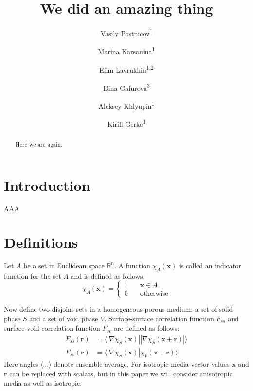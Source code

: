 \documentclass[reprint,amsmath,amssymb,aps,pre,showkeys,showpacs]{revtex4-1}
\begin{document}

\author{Vasily Postnicov\textsuperscript{1}}
\author{Marina Karsanina\textsuperscript{1}}
\author{Efim Lavrukhin\textsuperscript{1,2}}
\author{Dina Gafurova\textsuperscript{3}}
\author{Aleksey Khlyupin\textsuperscript{1}}
\author{Kirill Gerke\textsuperscript{1}}


\title{We did an amazing thing}

\begin{abstract}
  Here we are again.
\end{abstract}

\maketitle

\section{Introduction}
\label{sec:intro}
AAA

\section{Definitions}
\label{sec:def}
Let $A$ be a set in Euclidean space $\mathbb{R}^n$. A function
$\chi_A(\mathbf{x})$ is called an indicator function for the set $A$ and is
defined as follows:
\begin{equation*}
  \chi_A(\bm{x}) = \left\{
  \begin{array}{ll}
    1 & \quad \bm{x} \in A \\
    0 & \quad \text{otherwise}
  \end{array}
  \right.
\end{equation*}

Now define two disjoint sets in a homogeneous porous medium: a set of solid
phase $S$ and a set of void phase $V$. Surface-surface correlation function
$F_{ss}$ and surface-void correlation function $F_{sv}$ are defined as follows:
\begin{align}
  F_{ss}(\bm{r}) &= \langle |\nabla \chi_S(\bm{x})| |\nabla \chi_S(\bm{x} +
  \bm{r})| \rangle \label{eq:fss} \\
  F_{sv}(\bm{r}) &= \langle |\nabla \chi_S(\bm{x})| \chi_V(\bm{x} +
  \bm{r}) \rangle \label{eq:fsv}
\end{align}
Here angles $\langle \dots \rangle$ denote ensemble average. For isotropic media
vector values $\bm{x}$ and $\bm{r}$ can be replaced with scalars, but in this
paper we will consider anisotropic media as well as isotropic.
\end{document}
